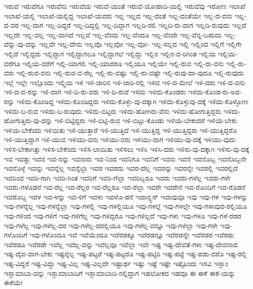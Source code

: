{ಇರುವೆ
ಇರುವೆಗೂ
ಇರುವೆನು
ಇರುವೆಯ
ಇರುವೆ-ಯಂತೆ
ಇರುವೆ-ಯೋಪಾದಿ-ಯಲ್ಲಿ
ಇರುವೆವು
ಇರೋಣ
ಇಲಾಖೆ
ಇಲಾಖೆ-ಯಲ್ಲಿ
ಇಲಾಖೆ-ಯಲ್ಲಿದ್ದ
ಇಲಾಖೆ-ಯವರು
ಇಲ್ಲ
ಇಲ್ಲದ
ಇಲ್ಲ-ದಂತೆ
ಇಲ್ಲ-ದಂತೆಯೇ
ಇಲ್ಲ-ದ-ವನು
ಇಲ್ಲ-ದ-ವರ
ಇಲ್ಲ-ದಾಗ
ಇಲ್ಲ-ದಿದ್ದರೆ
ಇಲ್ಲ-ದಿದ್ದಲ್ಲಿ
ಇಲ್ಲ-ದಿದ್ದಾಗ
ಇಲ್ಲದಿ-ರಲಿ
ಇಲ್ಲದಿ-ರು-ವಾಗ
ಇಲ್ಲದಿ-ರುವುದು
ಇಲ್ಲದೆ
ಇಲ್ಲದೇ
ಇಲ್ಲ-ವಲ್ಲ
ಇಲ್ಲ-ವಾಗಿದೆ
ಇಲ್ಲವೆ
ಇಲ್ಲ-ವೆಂದು
ಇಲ್ಲ-ವೆಂದೂ
ಇಲ್ಲ-ವೆಂದೇ
ಇಲ್ಲ-ವೆನ್ನ-ಬಹುದು
ಇಲ್ಲ-ವೆನ್ನು-ವು-ದನ್ನು
ಇಲ್ಲವೇ
ಇಲ್ಲ-ವೇನು
ಇಲ್ಲವೊ
ಇಲ್ಲವೋ
ಇಲ್ಲ-ವೋ-
ಇಲ್ಲ-ಸಲ್ಲದ
ಇಲ್ಲಿ
ಇಲ್ಲಿಂದ
ಇಲ್ಲಿಗೆ
ಇಲ್ಲಿಗೇ
ಇಲ್ಲಿದೆ
ಇಲ್ಲಿದ್ದರು
ಇಲ್ಲಿದ್ದಾಗ
ಇಲ್ಲಿದ್ದಾಗಲೂ
ಇಲ್ಲಿದ್ದಾಗಲೆ
ಇಲ್ಲಿದ್ದು
ಇಲ್ಲಿನ
ಇಲ್ಲಿನ-ವ-ರಿಗಿಂತ
ಇಲ್ಲಿಯ
ಇಲ್ಲಿಯ-ವರೆಗೂ
ಇಲ್ಲಿಯ-ವರೆಗೆ
ಇಲ್ಲಿ-ಯಾಗಲಿ
ಇಲ್ಲಿ-ಯಾದರೂ
ಇಲ್ಲಿಯೂ
ಇಲ್ಲಿಯೇ
ಇಲ್ಲಿ-ರುವ
ಇಲ್ಲಿ-ರು-ವನು
ಇಲ್ಲಿ-ರು-ವರು
ಇಲ್ಲಿ-ರುವ-ವನು
ಇಲ್ಲಿ-ರುವ-ವ-ರೆಲ್ಲ
ಇಲ್ಲಿ-ರು-ವಷ್ಟು
ಇಲ್ಲಿ-ರು-ವಷ್ಟೇ
ಇಲ್ಲಿ-ರುವು-ದಾ-ವುದೂ
ಇಲ್ಲಿ-ರುವುದು
ಇಲ್ಲೆ
ಇಲ್ಲೇ
ಇಲ್ಲೊಂದು
ಇಲ್ಲ್ಲಿಯ
ಇಳಿ
ಇಳಿ-ಜಾರಿನ
ಇಳಿ-ಜಾರಿ-ನಲ್ಲಿ
ಇಳಿದ
ಇಳಿ-ದ-ಮೇಲೆ
ಇಳಿ-ದರು
ಇಳಿ-ದ-ವನು
ಇಳಿ-ದ-ವ-ರನ್ನು
ಇಳಿ-ದಾಗ
ಇಳಿ-ದಿ-ರು-ವರು
ಇಳಿ-ದಿ-ರುವೆ
ಇಳಿದು
ಇಳಿದು-ಕೊಂಡರು
ಇಳಿದು-ಕೊಂಡ-ರು-ಅವ-ರನ್ನು
ಇಳಿದು-ಕೊಂಡಿದ್ದ
ಇಳಿದು-ಕೊಂಡಿದ್ದರು
ಇಳಿದು-ಕೊಳ್ಳು-ವು-ದಕ್ಕಾಗಿ
ಇಳಿದು-ಕೊಳ್ಳುವು-ದಕ್ಕೆ
ಇಳಿದು-ಕೊಳ್ಳೋಣ
ಇಳಿದು-ಬ-ರುವ
ಇಳಿದು-ಬ-ರುವುದು
ಇಳಿದು-ಬಿಟ್ಟರು
ಇಳಿದು-ಹೋಗಿರು-ವೆನು
ಇಳಿದು-ಹೋಗುತ್ತಿದ್ದರು
ಇಳಿದು-ಹೋಗುತ್ತಿರು-ವು-ದನ್ನು
ಇಳಿ-ಬಿಟ್ಟಿದ್ದರು
ಇಳಿ-ಬಿಟ್ಟಿ-ರುವ
ಇಳಿ-ಬಿಟ್ಟು-ಕೊಂಡು
ಇಳಿಯ-ಬೇಕಾದರೆ
ಇಳಿಯ-ಬೇಕು
ಇಳಿಯ-ಬೇಕೆಂದು
ಇಳಿಯಿತು
ಇಳಿ-ಯುತ್ತಾರೆ
ಇಳಿ-ಯುತ್ತಿದೆ
ಇಳಿ-ಯುತ್ತಿದ್ದ
ಇಳಿ-ಯುತ್ತಿದ್ದರು
ಇಳಿ-ಯುತ್ತಿದ್ದರೊ
ಇಳಿ-ಯುತ್ತಿದ್ದಾಗ
ಇಳಿ-ಯುವ
ಇಳಿಯು-ವನು
ಇಳಿಯು-ವರು
ಇಳಿಯು-ವಾಗ
ಇಳಿಯು-ವು-ದಕ್ಕೆ
ಇಳಿಯು-ವುದು
ಇಳಿಸ-ಬೇಕಾಗಿತ್ತು
ಇಳಿಸ-ಬೇಕೆಂದು
ಇಳಿಸ-ಲಾಯಿತು
ಇಳಿಸಲು
ಇಳಿಸಿ
ಇಳಿಸಿ-ದರು
ಇಳಿಸು-ವು-ದಕ್ಕಾಗಿ
ಇಳಿಸು-ವು-ದಕ್ಕೆ
ಇವ
ಇವತ್ತು
ಇವನ
ಇವ-ನನ್ನು
ಇವನಾರು
ಇವ-ನಿಂದ
ಇವನಿಗೂ
ಇವನಿಗೆ
ಇವನು
ಇವನೆ
ಇವನೊಬ್ಬ
ಇವನೊಬ್ಬನೇ
ಇವನೊಳ್ಳೆ
ಇವನ್ನು
ಇವನ್ನೆಲ್ಲ
ಇವನ್ನೆಲ್ಲಾ
ಇವರ
ಇವರದು
ಇವರ-ದೆಲ್ಲ
ಇವರನ್ನು
ಇವರನ್ನೇ
ಇವರಲ್ಲಿ
ಇವರಲ್ಲಿದೆ
ಇವರಿಂದ
ಇವರಿ-ಗಾಗಿ
ಇವರಿ-ಗಿಂತ
ಇವರಿಗೆ
ಇವರಿ-ಗೆಲ್ಲಾ
ಇವರಿಬ್ಬರೂ
ಇವರು
ಇವರು-ಗಳೆಲ್ಲ
ಇವರು-ಗಳೇ
ಇವರು-ಗಳೊಡನೆ
ಇವ-ರೆಲ್ಲ
ಇವ-ರೆಲ್ಲರ
ಇವ-ರೆಲ್ಲರೂ
ಇವ-ರೆಲ್ಲಾ
ಇವರೇ
ಇವರೇನೆ
ಇವ-ರೊಂದಿಗೆ
ಇವ-ರೊಡನೆ
ಇವರೊಬ್ಬ
ಇವಳ
ಇವ-ಳನ್ನು
ಇವ-ಳಿಗೆ
ಇವಳು
ಇವಳೊ-ಡನೆ
ಇವಾನ್ಸ್ಟನ್
ಇವಾವುವೂ
ಇವು
ಇವು-ಗಳ
ಇವು-ಗಳನ್ನು
ಇವು-ಗಳನ್ನೆಲ್ಲ
ಇವು-ಗಳನ್ನೆಲ್ಲಾ
ಇವು-ಗಳಲ್ಲಿ
ಇವು-ಗಳಲ್ಲಿಯೂ
ಇವು-ಗಳಲ್ಲೆ
ಇವು-ಗಳಲ್ಲೇ
ಇವು-ಗಳಾವುದ-ರಲ್ಲಿಯೂ
ಇವು-ಗಳಿಂದ
ಇವು-ಗಳಿಗೆ
ಇವು-ಗಳಿಗೆಲ್ಲ
ಇವು-ಗಳಿದ್ದರೂ
ಇವು-ಗಳಿಲ್ಲದೆ
ಇವು-ಗಳು
ಇವು-ಗಳೂ
ಇವು-ಗಳೆ-ರಡರ
ಇವು-ಗಳೆಲ್ಲ
ಇವು-ಗಳೆಲ್ಲ-ದರ
ಇವು-ಗಳೆಲ್ಲ-ದರಲ್ಲಿಯೂ
ಇವು-ಗಳೆಲ್ಲ-ವನ್ನೂ
ಇವು-ಗಳೆಲ್ಲಾ
ಇವು-ಗಳೇ
ಇವು-ಗಳೊಂದಿಗೆ
ಇವು-ಗಳೊಂದೂ
ಇವೆ
ಇವೆಯೆಂದೂ
ಇವೆರಡಕ್ಕೂ
ಇವೆರಡನ್ನೂ
ಇವೆರಡನ್ನೇ
ಇವೆರಡರ
ಇವೆರಡು
ಇವೆರಡೂ
ಇವೆರಡೇ
ಇವೆಲ್ಲ
ಇವೆಲ್ಲ-ವನ್ನು
ಇವೆಲ್ಲವೂ
ಇವೆಲ್ಲಾ
ಇವೇ
ಇಷ್ಟ
ಇಷ್ಟ-ದೇವತೆ-ಗಳು
ಇಷ್ಟ-ದೇವನಾದ
ಇಷ್ಟ-ದೈವ-ವಾಗ-ಬೇಕು
ಇಷ್ಟನ್ನೆಲ್ಲ
ಇಷ್ಟ-ಪಟ್ಟರೆ
ಇಷ್ಟ-ಪಟ್ಟರೊ
ಇಷ್ಟ-ಪಟ್ಟಿರಿ
ಇಷ್ಟ-ಪಟ್ಟೆ
ಇಷ್ಟ-ಪಡು-ವರೊ
ಇಷ್ಟ-ರಲ್ಲಿ
ಇಷ್ಟ-ವಿದ್ದರೆ
ಇಷ್ಟ-ವಿದ್ದು
ಇಷ್ಟ-ವಿಲ್ಲ
ಇಷ್ಟ-ವಿಲ್ಲದೇ
ಇಷ್ಟಾರ್ಥ
ಇಷ್ಟು
ಇಷ್ಟೆ
ಇಷ್ಟೇ
ಇಷ್ಟೊಂದು
ಇಸವಿ
ಇಸ್ಲಾಂ
ಇಸ್ಲಾಮಾಬಾ-ದನ್ನು
ಇಸ್ಲಾಮಾಬಾದಿಗೆ
ಇಸ್ಲಾಮಾಬಾದಿ-ನಲ್ಲಿದ್ದಾಗ
ಇಹಲೋಕದ
ಇಹವೂ
ಈ
ಈಕೆ
ಈಕೆ-ಯನ್ನು
ಈಕೆಯೇ
}
